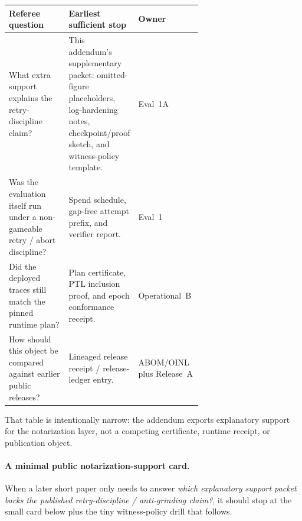 \documentclass[11pt]{article}
\begin{document}
\begin{center}
\begin{tabularx}{0.97\linewidth}{@{}>{\raggedright\arraybackslash}p{0.31\linewidth}>{\raggedright\arraybackslash}p{0.34\linewidth}>{\raggedright\arraybackslash}X@{}}
\toprule
\textbf{Referee question} & \textbf{Earliest sufficient stop} & \textbf{Owner} \\
\midrule
What extra support explains the retry-discipline claim? & This addendum's supplementary packet: omitted-figure placeholders, log-hardening notes, checkpoint/proof sketch, and witness-policy template. & Eval~1A \\
Was the evaluation itself run under a non-gameable retry / abort discipline? & Spend schedule, gap-free attempt prefix, and verifier report. & Eval~1 \\
Did the deployed traces still match the pinned runtime plan? & Plan certificate, PTL inclusion proof, and epoch conformance receipt. & Operational~B \\
How should this object be compared against earlier public releases? & Lineaged release receipt / release-ledger entry. & ABOM/OINL plus Release~A \\
\bottomrule
\end{tabularx}
\end{center}


That table is intentionally narrow: the addendum exports explanatory support for the notarization layer, not a competing certificate, runtime receipt, or publication object.

\paragraph{A minimal public notarization-support card.}
When a later short paper only needs to answer \emph{which explanatory support packet backs the published retry-discipline / anti-grinding claim?}, it should stop at the small card below plus the tiny witness-policy drill that follows.
\end{document}
